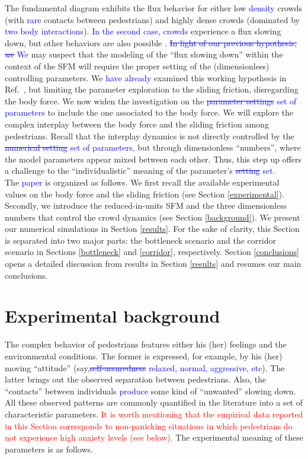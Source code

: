 \documentclass[preprint,12pt]{elsarticle}
\begin{document}
The fundamental diagram exhibits the flux behavior for either low \textcolor{blue}{density} crowds 
(with \textcolor{blue}{rare} contacts between pedestrians) and highly dense crowds (dominated 
by \textcolor{blue}{two body interactions}). \textcolor{blue}{In the second case, crowds} experience a flux 
slowing down, but other behaviors are also possible \cite{helbing_2007,lohner_2018}. \textcolor{blue}{
\sout{In light of our previous hypothesis, we } We} may suspect that the  modeling of the 
``flux slowing down'' within the context of the SFM will require the proper 
setting of the (dimensionless) controlling parameters. We \textcolor{blue}{have already}
examined this working hypothesis in Ref.~\cite{dorso_2019}, but limiting the parameter exploration to 
the sliding friction, disregarding the body force. 
We now widen the investigation on the \textcolor{blue}{\sout{parameter settings} set of parameters} to include the one 
associated to the body force. We will  explore 
 the complex interplay between 
the body force and the sliding friction among pedestrians. Recall that the 
interplay dynamics is not directly controlled by the \textcolor{blue}{\sout{numerical setting} set of parameters}, but 
through dimensionless ``numbers'', where the model parameters appear mixed 
between each other. Thus, this step up offers a challenge to the 
``individualistic'' meaning of the parameter's \textcolor{blue}{\sout{setting} set}. \\  


The \textcolor{blue}{paper} is organized as follows. We first recall the available 
experimental values on the body force and the sliding friction (see Section 
\ref{experimental}). Secondly, we introduce the reduced-in-units SFM and the 
three dimensionless numbers that control the crowd dynamics (see Section 
\ref{background}). We present our numerical simulations in Section 
\ref{results}. For the sake of clarity, this Section is 
separated into two major parts: the bottleneck scenario and the corridor 
scenario in Sections \ref{bottleneck} and \ref{corridor}, respectively. 
Section \ref{conclusions} opens a detailed discussion from results in Section \ref{results}
and resumes our main conclusions.

\section{\label{experimental}Experimental background}

The complex behavior of pedestrians features
 either his (her) feelings and 
the environmental conditions. The former is expressed, for example, by his 
(her) moving ``attitude'' (say,\textcolor{blue}{\sout{self-assuredness} relaxed, normal, aggressive, etc}).
The latter brings out the 
observed separation between pedestrians. Also, the ``contacts'' between 
individuals \textcolor{blue}{produce} some kind of ``unwanted'' slowing down. All these 
observed patterns are commonly quantified in the literature into a set of 
characteristic  parameters. \textcolor{red}{It is worth mentioning that the empirical
data reported in this Section corresponds to non-panicking situations in which pedestrians 
do not experience high anxiety levels (see below). }
The experimental meaning of these parameters is as follows.
\end{document}
